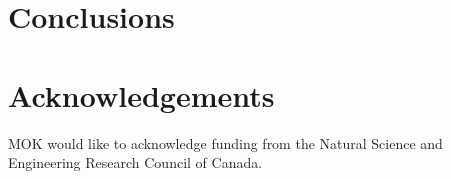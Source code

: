\documentclass[times,twocolumn,final]{elsarticle}
\begin{document}



\section{Conclusions}


\section*{Acknowledgements}
MOK would like to acknowledge funding from the Natural Science and Engineering Research Council of Canada. 



\end{document}
